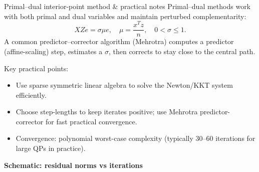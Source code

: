 \documentclass{beamer}
\begin{document}
\begin{frame}{Primal--dual interior-point method \& practical notes}
Primal--dual methods work with both primal and dual variables and maintain perturbed complementarity:
\[XZ e = \sigma \mu e,\quad \mu=\frac{x^T z}{n},\quad 0<\sigma\le1.
\]
A common predictor--corrector algorithm (Mehrotra) computes a predictor (affine-scaling) step, estimates a \(\sigma\), then corrects to stay close to the central path.

Key practical points:
\begin{itemize}
  \item Use sparse symmetric linear algebra to solve the Newton/KKT system efficiently.
  \item Choose step-lengths to keep iterates positive; use Mehrotra predictor-corrector for fast practical convergence.
  \item Convergence: polynomial worst-case complexity (typically 30--60 iterations for large QPs in practice).
\end{itemize}

\vspace{2mm}
\textbf{Schematic: residual norms vs iterations}
\begin{center}
\end{center}
\end{frame}
\end{document}
